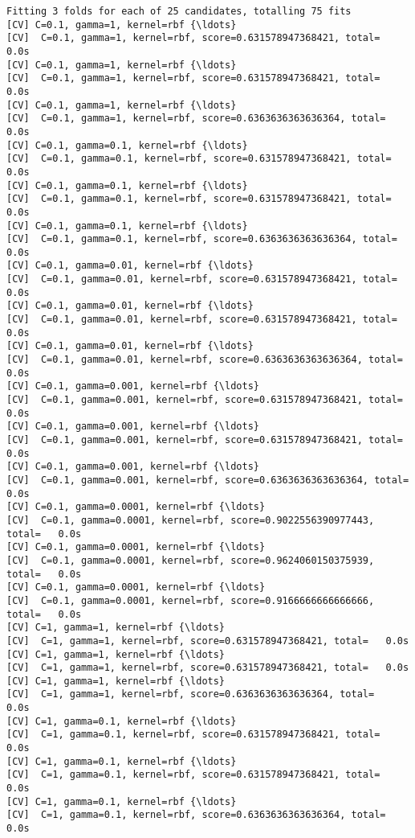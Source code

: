 \documentclass[11pt]{article}
\begin{document}
    \begin{Verbatim}[commandchars=\\\{\}]
Fitting 3 folds for each of 25 candidates, totalling 75 fits
[CV] C=0.1, gamma=1, kernel=rbf {\ldots}
[CV]  C=0.1, gamma=1, kernel=rbf, score=0.631578947368421, total=   0.0s
[CV] C=0.1, gamma=1, kernel=rbf {\ldots}
[CV]  C=0.1, gamma=1, kernel=rbf, score=0.631578947368421, total=   0.0s
[CV] C=0.1, gamma=1, kernel=rbf {\ldots}
[CV]  C=0.1, gamma=1, kernel=rbf, score=0.6363636363636364, total=   0.0s
[CV] C=0.1, gamma=0.1, kernel=rbf {\ldots}
[CV]  C=0.1, gamma=0.1, kernel=rbf, score=0.631578947368421, total=   0.0s
[CV] C=0.1, gamma=0.1, kernel=rbf {\ldots}
[CV]  C=0.1, gamma=0.1, kernel=rbf, score=0.631578947368421, total=   0.0s
[CV] C=0.1, gamma=0.1, kernel=rbf {\ldots}
[CV]  C=0.1, gamma=0.1, kernel=rbf, score=0.6363636363636364, total=   0.0s
[CV] C=0.1, gamma=0.01, kernel=rbf {\ldots}
[CV]  C=0.1, gamma=0.01, kernel=rbf, score=0.631578947368421, total=   0.0s
[CV] C=0.1, gamma=0.01, kernel=rbf {\ldots}
[CV]  C=0.1, gamma=0.01, kernel=rbf, score=0.631578947368421, total=   0.0s
[CV] C=0.1, gamma=0.01, kernel=rbf {\ldots}
[CV]  C=0.1, gamma=0.01, kernel=rbf, score=0.6363636363636364, total=   0.0s
[CV] C=0.1, gamma=0.001, kernel=rbf {\ldots}
[CV]  C=0.1, gamma=0.001, kernel=rbf, score=0.631578947368421, total=   0.0s
[CV] C=0.1, gamma=0.001, kernel=rbf {\ldots}
[CV]  C=0.1, gamma=0.001, kernel=rbf, score=0.631578947368421, total=   0.0s
[CV] C=0.1, gamma=0.001, kernel=rbf {\ldots}
[CV]  C=0.1, gamma=0.001, kernel=rbf, score=0.6363636363636364, total=   0.0s
[CV] C=0.1, gamma=0.0001, kernel=rbf {\ldots}
[CV]  C=0.1, gamma=0.0001, kernel=rbf, score=0.9022556390977443, total=   0.0s
[CV] C=0.1, gamma=0.0001, kernel=rbf {\ldots}
[CV]  C=0.1, gamma=0.0001, kernel=rbf, score=0.9624060150375939, total=   0.0s
[CV] C=0.1, gamma=0.0001, kernel=rbf {\ldots}
[CV]  C=0.1, gamma=0.0001, kernel=rbf, score=0.9166666666666666, total=   0.0s
[CV] C=1, gamma=1, kernel=rbf {\ldots}
[CV]  C=1, gamma=1, kernel=rbf, score=0.631578947368421, total=   0.0s
[CV] C=1, gamma=1, kernel=rbf {\ldots}
[CV]  C=1, gamma=1, kernel=rbf, score=0.631578947368421, total=   0.0s
[CV] C=1, gamma=1, kernel=rbf {\ldots}
[CV]  C=1, gamma=1, kernel=rbf, score=0.6363636363636364, total=   0.0s
[CV] C=1, gamma=0.1, kernel=rbf {\ldots}
[CV]  C=1, gamma=0.1, kernel=rbf, score=0.631578947368421, total=   0.0s
[CV] C=1, gamma=0.1, kernel=rbf {\ldots}
[CV]  C=1, gamma=0.1, kernel=rbf, score=0.631578947368421, total=   0.0s
[CV] C=1, gamma=0.1, kernel=rbf {\ldots}
[CV]  C=1, gamma=0.1, kernel=rbf, score=0.6363636363636364, total=   0.0s

\end{Verbatim}
\end{document}
